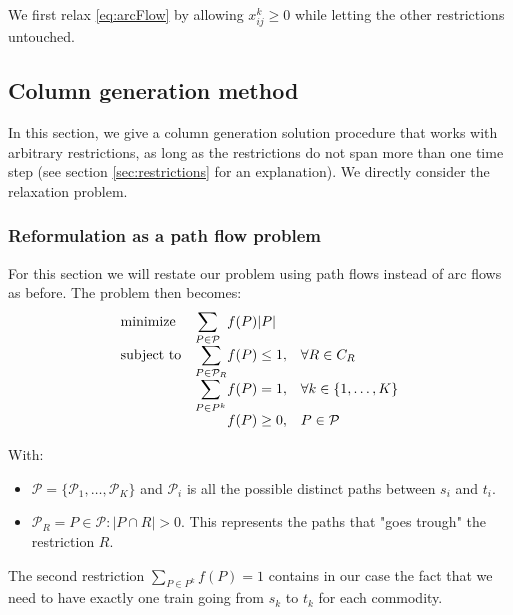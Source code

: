 \documentclass[14pt,a4paper]{article}
\theoremstyle{definition}
\numberwithin{equation}{subsection}
\begin{document}
We first relax \eqref{eq:arcFlow} by allowing $x_{ij}^k \geq 0$ while letting the other restrictions untouched. 



\subsection{Column generation method}

In this section, we give a column generation solution procedure that works with arbitrary restrictions, as long as the restrictions do not span more than one time step (see section \ref*{sec:restrictions} for an explanation). We directly consider the relaxation problem.

\subsubsection{Reformulation as a path flow problem}

For this section we will restate our problem using path flows instead of arc flows as before. The problem then becomes: 
\begin{equation}
	\begin{array}{ll@{}ll}
		\text{minimize}  & \displaystyle\sum\limits_{P \in \mathcal{P}} &f(P)|P| &\\
		\text{subject to}& \displaystyle\sum\limits_{P \in \mathcal{P}_R}   &f(P) \leq 1,  &\forall R \in C_R\\
	& \displaystyle\sum\limits_{P \in P^k}   &f(P) = 1,  &\forall k \in \{1,\ldots,K\}\\
		&                                                &f(P) \geq 0, &P\in \mathcal{P}
	\end{array}
\label{eq:pathFormulationPrimal}
\end{equation}

With: 
\begin{itemize}
	\item $\mathcal{P} = \{\mathcal{P}_1,\ldots,\mathcal{P}_K\}$ and $\mathcal{P}_i$ is all the possible distinct paths between $s_i$ and $t_i$.
	\item $\mathcal{P}_R = {P \in \mathcal{P}: |P\cap R| > 0 }$. This represents the paths that "goes trough" the restriction $R$.
\end{itemize}

The second restriction $\sum_{P \in P^k} f(P) = 1$ contains in our case the fact that we need to have exactly one train going from $s_k$ to $t_k$ for each commodity.
\end{document}

